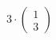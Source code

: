\documentclass[preview]{standalone}
\begin{document}
\begin{align*}
3\cdot\begin{pmatrix}1 \\ 3\end{pmatrix}
\end{align*}
\end{document}
